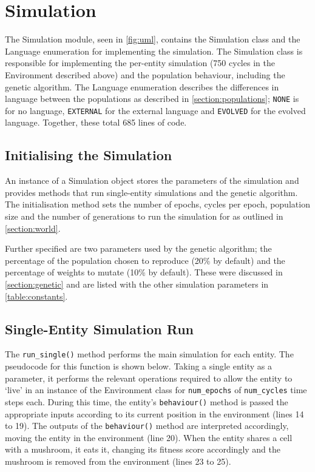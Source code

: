\documentclass[12pt,a4paper]{report}
\begin{document}
\section{Simulation}\label{section:simulation}

The Simulation module, seen in \cref{fig:uml}, contains the Simulation class and the Language enumeration for implementing the simulation. The Simulation class is responsible for implementing the per-entity simulation (750 cycles in the Environment described above) and the population behaviour, including the genetic algorithm. The Language enumeration describes the differences in language between the populations as described in \cref{section:populations}; \texttt{NONE} is for no language, \texttt{EXTERNAL} for the external language and \texttt{EVOLVED} for the evolved language. Together, these total 685 lines of code.

\subsection{Initialising the Simulation}\label{section:simulation-initialise}

An instance of a Simulation object stores the parameters of the simulation and provides methods that run single-entity simulations and the genetic algorithm. The initialisation method sets the number of epochs, cycles per epoch, population size and the number of generations to run the simulation for as outlined in \cref{section:world}.

Further specified are two parameters used by the genetic algorithm; the percentage of the population chosen to reproduce (20\% by default) and the percentage of weights to mutate (10\% by default). These were discussed in \cref{section:genetic} and are listed with the other simulation parameters in \cref{table:constants}.

\subsection{Single-Entity Simulation Run}\label{section:single-implementation}

The \texttt{run\_single()} method performs the main simulation for each entity. The pseudocode for this function is shown below. Taking a single entity as a parameter, it performs the relevant operations required to allow the entity to `live' in an instance of the Environment class for \texttt{num\_epochs} of \texttt{num\_cycles} time steps each. During this time, the entity's \texttt{behaviour()} method is passed the appropriate inputs according to its current position in the environment (lines 14 to 19). The outputs of the \texttt{behaviour()} method are interpreted accordingly, moving the entity in the environment (line 20). When the entity shares a cell with a mushroom, it eats it, changing its fitness score accordingly and the mushroom is removed from the environment (lines 23 to 25).
\end{document}
